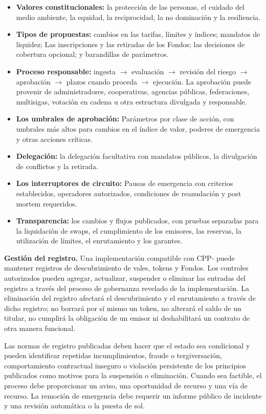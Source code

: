 \documentclass[11pt]{article}
\begin{document}
\begin{itemize}[leftmargin=*]
\item \textbf{Valores constitucionales:} la protección de las personas, el cuidado del medio ambiente, la equidad, la reciprocidad, la no dominación y la resiliencia.
\item \textbf{Tipos de propuestas:} cambios en las tarifas, límites y índices; mandatos de liquidez; Las inscripciones y las retiradas de los Fondos; las decisiones de cobertura opcional; y barandillas de parámetros.
\item \textbf{Proceso responsable:} ingesta $\to$ evaluación $\to$ revisión del riesgo $\to$ aprobación $\to$ plazos cuando proceda $\to$ ejecución. La aprobación puede provenir de administradores, cooperativas, agencias públicas, federaciones, multisigas, votación en cadena u otra estructura divulgada y responsable.
\item \textbf{Los umbrales de aprobación:} Parámetros por clase de acción, con umbrales más altos para cambios en el índice de valor, poderes de emergencia y otras acciones críticas.
\item \textbf{Delegación:} la delegación facultativa con mandatos públicos, la divulgación de conflictos y la retirada.
\item \textbf{Los interruptores de circuito:} Pausas de emergencia con criterios establecidos, operadores autorizados, condiciones de reanudación y post mortem requeridos.
\item \textbf{Transparencia:} los cambios y flujos publicados, con pruebas separadas para la liquidación de swaps, el cumplimiento de los emisores, las reservas, la utilización de límites, el enrutamiento y los garantes.
\end{itemize}
\textbf{Gestión del registro.} Una implementación compatible con CPP- puede mantener registros de descubrimiento de vales, tokens y Fondos. Los controles autorizados pueden agregar, actualizar, suspender o eliminar las entradas del registro a través del proceso de gobernanza revelado de la implementación. La eliminación del registro afectará el descubrimiento y el enrutamiento a través de dicho registro; no borrará por sí mismo un token, no alterará el saldo de un titular, no cumplirá la obligación de un emisor ni deshabilitará un contrato de otra manera funcional.

Las normas de registro publicadas deben hacer que el estado sea condicional y pueden identificar repetidas incumplimientos, fraude o tergiversación, comportamiento contractual inseguro o violación persistente de los principios publicados como motivos para la suspensión o eliminación. Cuando sea factible, el proceso debe proporcionar un aviso, una oportunidad de recurso y una vía de recurso. La remoción de emergencia debe requerir un informe público de incidente y una revisión automática o la puesta de sol.
\end{document}
